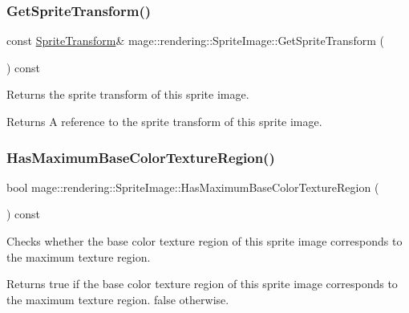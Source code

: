 \subsubsection{\texorpdfstring{Get\+Sprite\+Transform()}{GetSpriteTransform()}\hspace{0.1cm}{\footnotesize\ttfamily [2/2]}}
{\footnotesize\ttfamily const \mbox{\hyperlink{classmage_1_1_sprite_transform}{Sprite\+Transform}}\& mage\+::rendering\+::\+Sprite\+Image\+::\+Get\+Sprite\+Transform (\begin{DoxyParamCaption}{ }\end{DoxyParamCaption}) const\hspace{0.3cm}{\ttfamily [noexcept]}}

Returns the sprite transform of this sprite image.

\begin{DoxyReturn}{Returns}
A reference to the sprite transform of this sprite image. 
\end{DoxyReturn}
\mbox{\label{classmage_1_1rendering_1_1_sprite_image_a89e9dd78d50c2c312e06686bcc7347c1}} 
\subsubsection{\texorpdfstring{Has\+Maximum\+Base\+Color\+Texture\+Region()}{HasMaximumBaseColorTextureRegion()}}
{\footnotesize\ttfamily bool mage\+::rendering\+::\+Sprite\+Image\+::\+Has\+Maximum\+Base\+Color\+Texture\+Region (\begin{DoxyParamCaption}{ }\end{DoxyParamCaption}) const\hspace{0.3cm}{\ttfamily [noexcept]}}

Checks whether the base color texture region of this sprite image corresponds to the maximum texture region.

\begin{DoxyReturn}{Returns}
{\ttfamily true} if the base color texture region of this sprite image corresponds to the maximum texture region. {\ttfamily false} otherwise. 
\end{DoxyReturn}
\mbox{\label{classmage_1_1rendering_1_1_sprite_image_acf6e19eaf380ea76e4361778693facf2}} 

